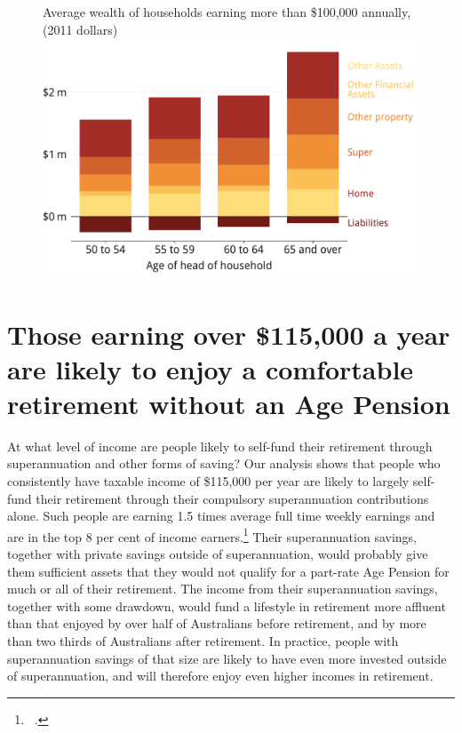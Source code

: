 \begin{figure}
%
{Average wealth of households earning more than \$100,000 annually, (2011 dollars)}\label{fig:SUPER-3-2}
\includegraphics[width=\linewidth]{b5-super-atlas/Figure3-2-1.pdf}

\end{figure}

\section{Those earning over \$115,000 a year are likely to enjoy a comfortable retirement without an Age Pension}\label{sec:SUPER-3-3}
At what level of income are people likely to self-fund their retirement through superannuation and other forms of saving? Our analysis shows that people who consistently have taxable income of \$115,000 per year are likely to largely self-fund their retirement through their compulsory superannuation contributions alone. Such people are earning 1.5 times average full time weekly earnings and are in the top 8 per cent of income earners.\footnote{\gao\ \textcites{ATO2015SampleFile1213}{ABS2013AWE}.} Their superannuation savings, together with private savings outside of superannuation, would probably give them sufficient assets that they would not qualify for a part-rate Age Pension for much or all of their retirement. The income from their superannuation savings, together with some drawdown, would fund a lifestyle in retirement more affluent than that enjoyed by over half of Australians before retirement, and by more than two thirds of Australians after retirement. In practice, people with superannuation savings of that size are likely to have even more invested outside of superannuation, and will therefore enjoy even higher incomes in retirement.

